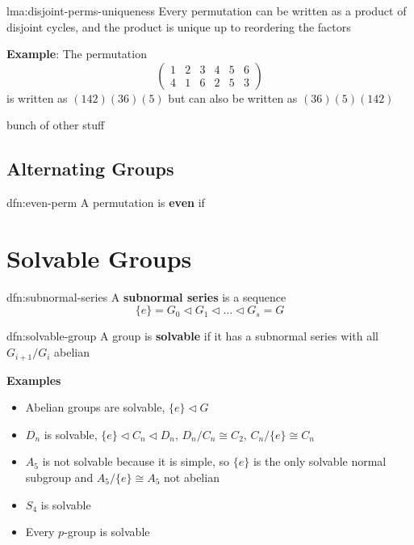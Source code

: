 \documentclass{article}
\begin{document}
\begin{lma}{lma:disjoint-perms-uniqueness}{}
    Every permutation can be written as a product of disjoint cycles, and the product is unique up to reordering the factors
\end{lma}

\textbf{Example}: The permutation
\[\begin{pmatrix}
    1& 2& 3& 4& 5& 6\\
    4& 1& 6& 2& 5& 3
\end{pmatrix}\]
is written as $(142)(36)(5)$ but can also be written as $(36)(5)(142)$

bunch of other stuff

\subsection{Alternating Groups}
\begin{dfn}{dfn:even-perm}{}
    A permutation is \textbf{even} if 
\end{dfn}

\newpage
\section{Solvable Groups}
\begin{dfn}{dfn:subnormal-series}{}
    A \textbf{subnormal series} is a sequence
    \[\{e\} = G_{0} \lhd G_{1} \lhd \dots \lhd G_{s} = G\]
\end{dfn}

\begin{dfn}{dfn:solvable-group}{}
    A group is \textbf{solvable} if it has a subnormal series with all $G_{i+1} /G_{i}$ abelian
\end{dfn}

\textbf{Examples}
\begin{itemize}
    \item Abelian groups are solvable, $\{e\} \lhd G$
    \item $D_{n}$ is solvable, $\{e\} \lhd C_{n} \lhd D_{n},\,D_{n} / C_{n} \cong C_{2},\,C_{n} /\{e\} \cong C_{n}$
    \item $A_{5}$ is not solvable because it is simple, so $\{e\}$ is the only solvable normal subgroup and $A_{5} /\{e\} \cong A_{5}$ not abelian
    \item $S_{4}$ is solvable
    \item Every $p$-group is solvable
\end{itemize}
\end{document}
